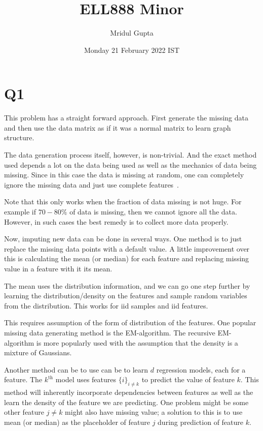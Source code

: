 \documentclass[11pt]{article}
\author{Mridul Gupta}
\date{Monday 21 February 2022 IST}
\title{ELL888 Minor}
\begin{document}
\maketitle
\section{Q1}
\label{sec:orge586eff}
This problem has a straight forward approach. First generate the
missing data and then use the data matrix as if it was a normal matrix
to learn graph structure.\par The data generation process itself,
however, is non-trivial. And the exact method used depends a lot on
the data being used as well as the mechanics of data being
missing. Since in this case the data is missing at random, one can
completely ignore the missing data and just use complete
features~\cite{links_1}.\par
Note that this only works when the fraction of data missing is not
huge. For example if \(70-80\%\) of data is missing, then we cannot
ignore all the data. However, in such cases the best remedy is to
collect more data properly.\par
Now, imputing new data can be done in several ways. One method is to
just replace the missing data points with a default value. A little
improvement over this is calculating the mean (or median) for each
feature and replacing missing value in a feature with it its mean.\par
The mean uses the distribution information, and we can go one step
further by learning the distribution/density on the features and
sample random variables from the distribution. This works for iid
samples and iid features.\par
This requires assumption of the form of distribution of the
features. One popular missing data generating method is the
EM-algorithm. The recursive EM-algorithm is more popularly used with
the assumption that the density is a mixture of Gaussians.\par
Another method can be to use can be to learn \(d\) regression models,
each for a feature. The \(k^{\text{th}}\) model uses features
\(\{i\}_{i\neq k}\) to predict the value of feature \(k\). This method
will inherently incorporate dependencies between features as well as
the learn the density of the feature we are predicting. One problem
might be some other feature \(j\neq k\) might also have missing value;
a solution to this is to use mean (or median) as the placeholder of
feature \(j\) during prediction of feature \(k\).
\end{document}
